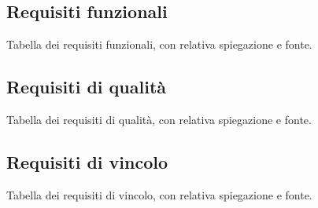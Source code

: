 


\subsection{Requisiti funzionali}
Tabella dei requisiti funzionali, con relativa spiegazione e fonte.

\subsection{Requisiti di qualità}
Tabella dei requisiti di qualità, con relativa spiegazione e fonte.

\subsection{Requisiti di vincolo}
Tabella dei requisiti di vincolo, con relativa spiegazione e fonte.
